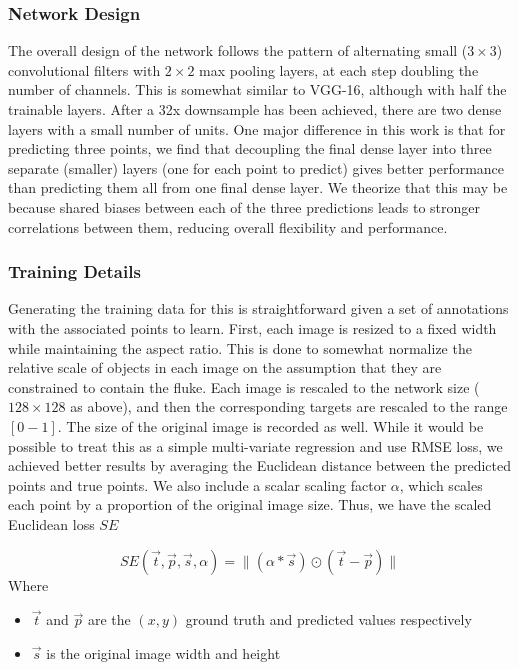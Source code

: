\subsubsection{Network Design}

The overall design of the network follows the pattern of alternating small ($3 \times 3$) convolutional filters with $2 \times 2$ max pooling layers, at each step doubling the number of channels.
This is somewhat similar to VGG-16, although with half the trainable layers.
After a 32x downsample has been achieved, there are two dense layers with a small number of units.
One major difference in this work is that for predicting three points, we find that decoupling the final dense layer into three separate (smaller) layers (one for each point to predict) gives better performance than predicting them all from one final dense layer.
We theorize that this may be because shared biases between each of the three predictions leads to stronger correlations between them, reducing overall flexibility and performance.

\subsubsection{Training Details}

Generating the training data for this is straightforward given a set of annotations with the associated points to learn.
First, each image is resized to a fixed width while maintaining the aspect ratio.
This is done to somewhat normalize the relative scale of objects in each image on the assumption that they are constrained to contain the fluke.
Each image is rescaled to the network size ($128 \times 128$ as above), and then the corresponding targets are rescaled to the range $[0-1]$.
The size of the original image is recorded as well.
While it would be possible to treat this as a simple multi-variate regression and use RMSE loss, we achieved better results by averaging the Euclidean distance between the predicted points and true points.
We also include a scalar scaling factor $\alpha$, which scales each point by a proportion of the original image size.
Thus, we have the scaled Euclidean loss $SE$

\begin{equation}
SE(\vec{t}, \vec{p}, \vec{s}, \alpha) = \lVert (\alpha * \vec{s}) \odot (\vec{t} - \vec{p}) \rVert
\end{equation}
Where
\begin{itemize}
    \item $\vec{t}$ and $\vec{p}$ are the $(x, y)$ ground truth and predicted values respectively
    \item $\vec{s}$ is the original image width and height
\end{itemize}


